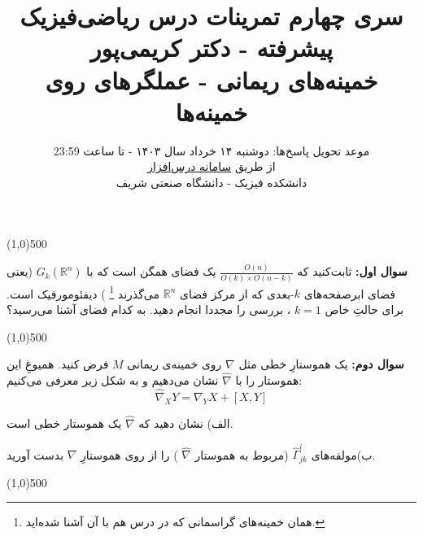 \documentclass{article}
\title{ سری چهارم تمرینات درس ریاضی‌فیزیک پیشرفته - دکتر کریمی‌پور
	\\
	\vspace{-1em}
	{\Large
		خمینه‌های ریمانی - عملگرهای روی خمینه‌ها}
		\\
		
}
\author{موعد تحویل پاسخ‌ها:
	دوشنبه ۱۴ خرداد سال ۱۴۰۳ - تا ساعت 23:59
	\\
	از طریق 
	\href{https://cw.sharif.edu/}{سامانه درس‌افزار}
	\\
	دانشکده فیزیک - دانشگاه صنعتی شریف
}\date{}
\newenvironment{parind}{%
	\par%
	\medskip
	\leftskip=0mm\rightskip=7mm
	\noindent\ignorespaces}{%
	\par\medskip}
\begin{document}
	\maketitle
	
	\def\endline{		{
			\vspace{-2.5em}
			\color{cyan}
			\begin{center} \linethickness{1mm}\line(1,0){500} \end{center}
	}}
	\def\thinendline{		{
			\vspace{-2.5em}
			\color{purple}
			\begin{center} \linethickness{0.5mm}\line(1,0){500} \end{center}
	}}
	\vspace{-1.5em}
	\endline
	
	\vspace{-1em}
	\noindent
	\textbf{سوال اول:}
ثابت‌کنید که 
$\frac{O(n)}{O(k)\times O(n-k)}$
یک فضای همگن است که با 
$G_k(\mathbb{R}^n)$
(یعنی فضای ابرصفحه‌های 
$k$-بعدی
که از مرکز فضای 
$\mathbb{R}^n$
می‌گذرند
\footnote{همان خمینه‌های گراسمانی که در درس ‌هم با آن آشنا شده‌اید.}
)
دیفئومورفیک است. برای حالتِ خاص 
$k=1$
، بررسی را مجددا انجام دهید. به کدام فضای آشنا می‌رسید؟
	
	
	\vspace{-1em}
	\endline
	
	\vspace{-1em}
	\textbf{سوال دوم:}
	یک هموستارِ خطی
	مثل 
	$\nabla$
	روی خمینه‌ی ریمانی 
	$M$ فرض کنید. همیوغِ این هموستار را با 
	$\widehat{\nabla}$
	نشان می‌دهیم و به شکل زیر معرفی می‌کنیم:
	\[
	\widehat{\nabla}_XY = \nabla_YX +[X,Y]
	\]
	\begin{parind}
		الف) نشان دهید که 
		$\widehat{\nabla}$
		یک هموستار خطی است.
		
		ب)مولفه‌های 
		$\widehat{\Gamma}^i_{jk}$
		(مربوط به هموستار
		$\widehat{\nabla}$
		)
		را از روی هموستارِ
		${\nabla}$
		بدست آورید.
	\end{parind}
	\vspace{-1em}
	\endline
	
\end{document}

